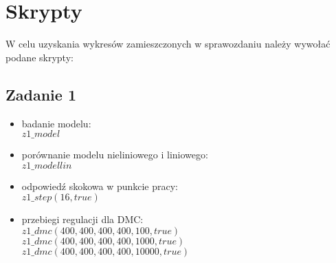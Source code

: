 \chapter{Skrypty}
	\label{ch:skrypty}
	W celu uzyskania wykresów zamieszczonych w sprawozdaniu należy wywołać podane skrypty:
	\section{Zadanie 1}
	\begin{itemize}
		\item badanie modelu:\\
		$z1\_model$
		\item porównanie modelu nieliniowego i liniowego:\\
		$z1\_modellin$
		\item odpowiedź skokowa w punkcie pracy:\\
		$z1\_step(16, true)$
		\item przebiegi regulacji dla DMC:\\
		$z1\_dmc(400, 400, 400, 400, 100, true)$\\
		$z1\_dmc(400, 400, 400, 400, 1000, true)$\\
		$z1\_dmc(400, 400, 400, 400, 10000, true)$\\	
	\end{itemize}